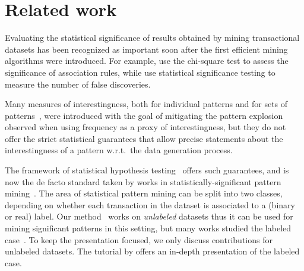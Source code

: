\section{Related work}\label{sec:related}

Evaluating the statistical significance of results obtained by mining
transactional datasets has been recognized as important soon after the first
efficient mining algorithms were introduced. For example, \citet{BrinMS97}
use the chi-square test to assess the significance of association rules, while
\citet{MegiddoS98} use statistical significance testing to measure the number of
false discoveries.

Many measures of interestingness, both for individual patterns and for sets of
patterns~\citep{KontonasiosSDB12,TanKS04,VreekenT14}, were introduced with the
goal of mitigating the pattern explosion observed when using frequency as a
proxy of interestingness, but they do not offer the strict statistical
guarantees that allow precise statements about the interestingness of a pattern
w.r.t.\ the data generation process.

The framework of statistical hypothesis testing~\citep[Ch.\ 10]{Wasserman05}
offers such guarantees, and is now the de facto standard taken by works in
statistically-significant pattern mining~\citep{HamalainenW19,PellegrinaRV19b}.
The area of statistical pattern mining can be split into two classes, depending
on whether each transaction in the dataset is associated to a (binary or real)
label. Our method \algo\ works on \emph{unlabeled} datasets thus it can be used
for mining significant patterns in this setting, but many works studied the
labeled
case~\citep{LlinaresLopezSPB15,MinatoUTTS14,PellegrinaV20,PellegrinaRV19a,TeradaOHTS13,WuHGLZY16,KomiyamaIANM17}.
To keep the presentation focused, we only discuss contributions for unlabeled
datasets. The tutorial by \citet{PellegrinaRV19b} offers an in-depth
presentation of the labeled case.

